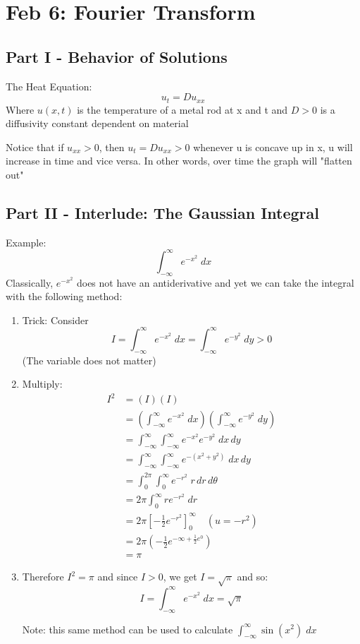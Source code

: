 \documentclass[12pt]{article}
\begin{document}
\section{Feb 6: Fourier Transform}
\subsection*{Part I - Behavior of Solutions}
The Heat Equation:
\[u_t = Du_{xx}\]
Where $u(x, t)$ is the temperature of a metal rod at x and t and $D > 0$ is a diffusivity constant dependent on material

Notice that if $u_{xx} > 0$, then $u_t = Du_{xx} > 0$ whenever u is concave up in x, u will increase in time and vice versa. In other words, over time the graph will "flatten out"

\subsection*{Part II - Interlude: The Gaussian Integral}
Example: \[\int_{-\infty}^\infty e^{-x^2}\; dx\]
Classically, $e^{-x^2}$ does not have an antiderivative and yet we can take the integral with the following method:
\begin{enumerate}
    \item Trick: Consider 
    \[I = \int_{-\infty}^\infty e^{-x^2} \; dx = \int_{-\infty}^\infty e^{-y^2} \; dy > 0 \]
    (The variable does not matter)
    \item Multiply:
    \begin{align*}
        I^2 &= (I)(I)\\
        &= \left(\int_{-\infty}^\infty e^{-x^2} \; dx\right)\left(\int_{-\infty}^\infty e^{-y^2} \; dy\right)\\
        &= \int_{-\infty}^\infty \int_{-\infty}^\infty e^{-x^2} e^{-y^2} \; dx\, dy\\
        &= \int_{-\infty}^\infty \int_{-\infty}^\infty e^{-(x^2 +y^2)} \; dx\, dy\\
        &= \int_0^{2\pi} \int_0^\infty e^{-r^2} \; r\, dr\, d\theta\\
        &= 2\pi \int_0^\infty re^{-r^2} \; dr\\
        &= 2\pi \left[-\frac{1}{2}e^{-r^2}\right]_0^\infty \quad (u = -r^2)\\
        &= 2\pi \left(-\frac{1}{2}e^{-\infty + \frac{1}{2}e^0}\right)\\
        &= \pi        
    \end{align*}
    \item Therefore $I^2 = \pi$ and since $I > 0$, we get $I = \sqrt{\pi}$ and so:
    \[I = \int_{-\infty}^\infty e^{-x^2} \; dx =\sqrt{\pi}\]

    Note: this same method can be used to calculate $\int_{-\infty}^\infty \sin(x^2)\; dx$
\end{enumerate}
\end{document}
